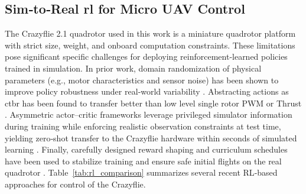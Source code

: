 \subsection{Sim‐to‐Real \gls{rl} for Micro UAV Control}
The Crazyflie 2.1 quadrotor used in this work is a miniature quadrotor platform with strict size, weight, and onboard computation constraints. These limitations pose significant specific challenges for deploying reinforcement‐learned policies trained in simulation. In prior work, domain randomization of physical parameters (e.g., motor characteristics and sensor noise) has been shown to improve policy robustness under real‐world variability \autocite{molchanov_sim--multi-real_2019}. Abstracting actions as \gls{ctbr} has been found to transfer better than low level single rotor PWM or Thrust  \autocite{kaufmann_benchmark_2022}. Asymmetric actor–critic frameworks leverage privileged simulator information during training while enforcing realistic observation constraints at test time, yielding zero‐shot transfer to the Crazyflie hardware within seconds of simulated learning \autocite{eschmann_learning_2024}. Finally, carefully designed reward shaping and curriculum schedules have been used to stabilize training and ensure safe initial flights on the real quadrotor \autocite{chen_what_2024}. Table~\ref{tab:rl_comparison} summarizes several recent RL‐based approaches for control of the Crazyflie.
